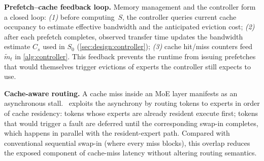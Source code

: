 \textbf{Prefetch--cache feedback loop.}
Memory management and the controller form a closed loop:
\textit{(1)} before computing~$S$, the controller queries current cache
occupancy to estimate effective bandwidth and the anticipated eviction
cost; \textit{(2)} after each prefetch completes, observed transfer
time updates the bandwidth estimate $C_s$ used in $S_0$
(\autoref{sec:design:controller}); \textit{(3)} cache hit/miss counters
feed $\tilde{m}_t$ in \autoref{alg:controller}. This feedback prevents
the runtime from issuing prefetches that would themselves trigger
evictions of experts the controller still expects to use.

\textbf{Cache-aware routing.}
A cache miss inside an MoE layer manifests as an asynchronous stall.
\systemname\ exploits the asynchrony by routing tokens to experts in
order of cache residency: tokens whose experts are already resident
execute first; tokens that would trigger a fault are deferred until
the corresponding swap-in completes, which happens in parallel with
the resident-expert path. Compared with conventional sequential
swap-in (where every miss blocks), this overlap reduces the exposed
component of cache-miss latency without altering routing semantics.
